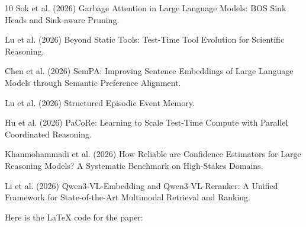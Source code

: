 \begin{thebibliography}{10}
Sok et al. (2026) Garbage Attention in Large Language Models: BOS Sink Heads and Sink-aware Pruning.

Lu et al. (2026) Beyond Static Tools: Test-Time Tool Evolution for Scientific Reasoning.

Chen et al. (2026) SemPA: Improving Sentence Embeddings of Large Language Models through Semantic Preference Alignment.

Lu et al. (2026) Structured Episodic Event Memory.

Hu et al. (2026) PaCoRe: Learning to Scale Test-Time Compute with Parallel Coordinated Reasoning.

Khanmohammadi et al. (2026) How Reliable are Confidence Estimators for Large Reasoning Models? A Systematic Benchmark on High-Stakes Domains.

Li et al. (2026) Qwen3-VL-Embedding and Qwen3-VL-Reranker: A Unified Framework for State-of-the-Art Multimodal Retrieval and Ranking.

\end{thebibliography}
        
        Here is the LaTeX code for the paper:
\documentclass{article}
\usepackage[margin=1in]{geometry}
\usepackage{amsmath}
\usepackage{amsfonts}
\usepackage{amssymb}
\usepackage{graphicx}
\usepackage{float}
\usepackage{caption}
\usepackage{subcaption}
\usepackage{booktabs}
\usepackage{longtable}
\usepackage{array}
\usepackage{multirow}
\usepackage{makecell}
\usepackage{tabularx}
\usepackage{adjustbox}
\usepackage{floatrow}
\usepackage{threeparttable}
\usepackage{threeparttablex}
\usepackage{pdflscape}
\usepackage{rotating}
\usepackage{microtype}
\usepackage{enumitem}
\usepackage{ulem}
\usepackage{etoolbox}
\usepackage{lineno}
\usepackage{cleveref}
\usepackage{xcolor}
\usepackage{hyperref}
\usepackage{minted}
\usepackage{subfiles}



